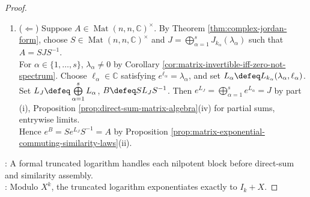 \begin{theorem}
\begin{proof}
\begin{enumerate}[label=(\roman*)]
\item[$(ii)$] ($\Leftarrow$) Suppose $A\in\operatorname{Mat}(n,n,\mathbb{C})^{\times}$. By Theorem \ref{thm:complex-jordan-form}, choose $S\in\operatorname{Mat}(n,n,\mathbb{C})^{\times}$ and $J=\bigoplus\limits_{\alpha=1}^sJ_{k_{\alpha}}(\lambda_{\alpha})$ such that $A=SJS^{-1}$.\\
For $\alpha\in\{1,\ldots,s\}$, $\lambda_{\alpha}\neq0$ by Corollary \ref{cor:matrix-invertible-iff-zero-not-spectrum}. Choose $\ell_{\alpha}\in\mathbb{C}$ satisfying $e^{\ell_{\alpha}}=\lambda_{\alpha}$, and set $L_{\alpha}\defeq L_{k_{\alpha}}(\lambda_{\alpha},\ell_{\alpha})$.\\
Set $L_J\defeq\bigoplus\limits_{\alpha=1}^sL_{\alpha}$, $B\defeq SL_JS^{-1}$. Then $e^{L_J}=\bigoplus\limits_{\alpha=1}^se^{L_{\alpha}}=J$ by part (i), Proposition \ref{prop:direct-sum-matrix-algebra}(iv) for partial sums, entrywise limits.\\
Hence $e^B=Se^{L_J}S^{-1}=A$ by Proposition \ref{prop:matrix-exponential-commuting-similarity-laws}(ii).
\end{enumerate}
: A formal truncated logarithm handles each nilpotent block before direct-sum and similarity assembly.\\
: Modulo $X^k$, the truncated logarithm exponentiates exactly to $I_k+X$.
\end{proof}
\end{theorem}

